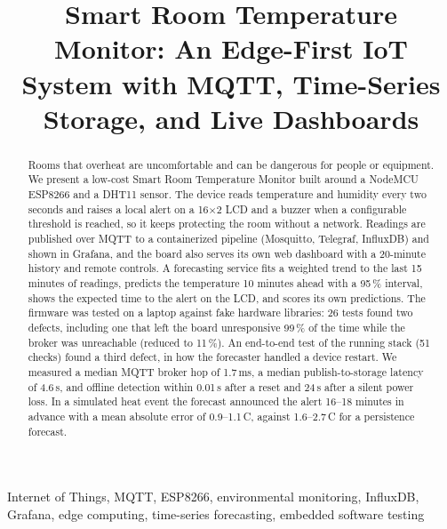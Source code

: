 \documentclass[conference]{IEEEtran}
\begin{document}
\title{Smart Room Temperature Monitor: An Edge-First IoT System with MQTT, Time-Series Storage, and Live Dashboards}

\author{
\and
{}
}

\maketitle

\begin{abstract}
Rooms that overheat are uncomfortable and can be dangerous for people or equipment. We present a low-cost Smart Room Temperature
Monitor built around a NodeMCU ESP8266 and a DHT11 sensor. The device reads temperature
and humidity every two seconds and raises a local alert on a 16$\times$2 LCD and a buzzer
when a configurable threshold is reached, so it keeps protecting the room without a
network. Readings are published over MQTT to a containerized pipeline (Mosquitto,
Telegraf, InfluxDB) and shown in Grafana, and the board also serves its own web dashboard
with a 20-minute history and remote controls. A forecasting service fits a weighted trend to the
last 15 minutes of readings, predicts the temperature 10 minutes ahead with a 95\,\%
interval, shows the expected time to the alert on the LCD, and scores its own
predictions. The firmware was tested on a laptop against fake hardware libraries:
26 tests found two defects, including one that left the board unresponsive 99\,\% of the
time while the broker was unreachable (reduced to 11\,\%). An end-to-end test of the running stack (51 checks) found a third
defect, in how the forecaster handled a device restart. We measured a median MQTT broker
hop of 1.7\,ms, a median publish-to-storage latency of 4.6\,s, and offline detection within
0.01\,s after a reset and 24\,s after a silent power loss. In a simulated heat event the
forecast announced the alert 16--18 minutes in advance with a mean absolute error of
0.9--1.1\,\textdegree C, against 1.6--2.7\,\textdegree C for a persistence forecast.
\end{abstract}

\begin{IEEEkeywords}
Internet of Things, MQTT, ESP8266, environmental monitoring, InfluxDB, Grafana,
edge computing, time-series forecasting, embedded software testing
\end{IEEEkeywords}
\end{document}
